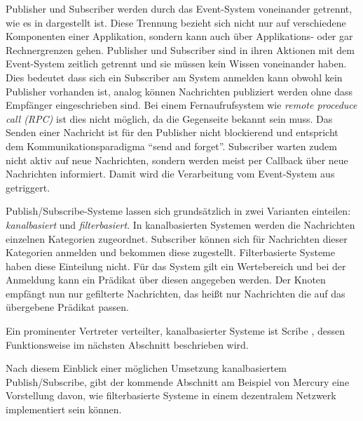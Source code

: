 Publisher und Subscriber werden durch das Event-System voneinander getrennt, wie es in  dargestellt ist. Diese Trennung bezieht sich nicht nur auf verschiedene Komponenten einer Applikation, sondern kann auch über Applikations- oder gar Rechnergrenzen gehen. Publisher und Subscriber sind in ihren Aktionen mit dem Event-System zeitlich getrennt und sie müssen kein Wissen voneinander haben. Dies bedeutet dass sich ein Subscriber am System anmelden kann obwohl kein Publisher vorhanden ist, analog können Nachrichten publiziert werden ohne dass Empfänger eingeschrieben sind. Bei einem Fernaufrufsystem wie \emph{remote proceduce call (RPC)} \cite{Birrell1984Implementing} ist dies nicht möglich, da die Gegenseite bekannt sein muss. Das Senden einer Nachricht ist für den Publisher nicht blockierend und entspricht dem Kommunikationsparadigma ``send and forget''. Subscriber warten zudem nicht aktiv auf neue Nachrichten, sondern werden meist per Callback über neue Nachrichten informiert. Damit wird die Verarbeitung vom Event-System aus getriggert. 

Publish/Subscribe-Systeme lassen sich grundsätzlich in zwei Varianten einteilen: \emph{kanalbasiert} und \emph{filterbasiert}. In kanalbasierten Systemen werden die Nachrichten einzelnen Kategorien zugeordnet. Subscriber können sich für Nachrichten dieser Kategorien anmelden und bekommen diese zugestellt. Filterbasierte Systeme haben diese Einteilung nicht. Für das System gilt ein Wertebereich und bei der Anmeldung kann ein Prädikat über diesen angegeben werden. Der Knoten empfängt nun nur gefilterte Nachrichten, das heißt nur Nachrichten die auf das übergebene Prädikat passen.

Ein prominenter Vertreter verteilter, kanalbasierter Systeme ist Scribe \cite{Castro2002Scribe}, dessen Funktionsweise im nächsten Abschnitt beschrieben wird.



Nach diesem Einblick einer möglichen Umsetzung kanalbasiertem Publish/Subscribe, gibt der kommende Abschnitt am Beispiel von Mercury \cite{Bharambe2004Mercury} eine Vorstellung davon, wie filterbasierte Systeme in einem dezentralem Netzwerk implementiert sein können.






